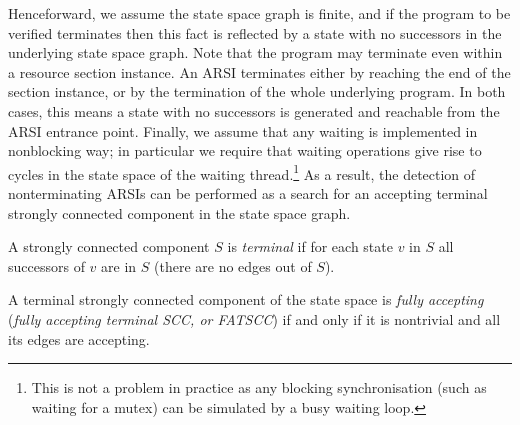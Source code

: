 Henceforward, we assume the state space graph is finite, and if the program to
be verified terminates then this fact is reflected by a state with no
successors in the underlying state space graph. Note that the program may
terminate even within a resource section instance. An ARSI terminates either by
reaching the end of the section instance, or by the termination of the whole
underlying program. In both cases, this means a state with no successors is
generated and reachable from the ARSI entrance point.
Finally, we assume that any waiting is implemented in nonblocking way; in
particular we require that waiting operations give rise to cycles in the state
space of the waiting thread.\footnote{This is not a problem in practice as any
    blocking synchronisation (such as waiting for a mutex) can be simulated by a
    busy waiting loop.}
As a result, the detection
of nonterminating ARSIs can be performed as a search for an accepting terminal
strongly connected component in the state space graph.

\begin{definition}
A strongly connected component $S$ is \emph{terminal}\footnotemark{} if for each state $v$ in $S$ all successors of $v$ are in $S$ (there are no edges out of $S$).

\end{definition}

\begin{definition}
A terminal strongly connected component of the state space is \emph{fully
  accepting} (\emph{fully accepting terminal SCC, or FATSCC}) if and only if it is nontrivial and all its edges are accepting.
\end{definition}


